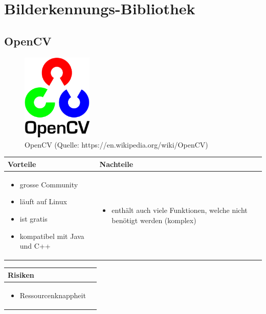 
\section{Bilderkennungs-Bibliothek}


\subsection{OpenCV}

\begin{figure}[h!]%
\centering
\includegraphics[width=0.3\textwidth]{fig/opencv.png}
\caption{OpenCV (Quelle: https://en.wikipedia.org/wiki/OpenCV)}
\label{fig:OpenCV}
\end{figure}

\begin{table}[h]
\begin{tabular}{p{} | p{}}



 \textbf{Vorteile} & \textbf{Nachteile} \\ \hline
	 
\begin{itemize}
\item grosse Community
\item läuft auf Linux
\item ist gratis
\item kompatibel mit Java und C++
\end{itemize}

 
 &
 
\begin{itemize}
\item enthält auch viele Funktionen, welche nicht benötigt werden (komplex)
\end{itemize}

\end{tabular}
\end{table}

\begin{table}[h]
\begin{tabular}{p{}p{}}


 \textbf{Risiken} & \\ \hline
	 
\begin{itemize}
\item Ressourcenknappheit
\end{itemize}

 
\end{tabular}
\end{table}

